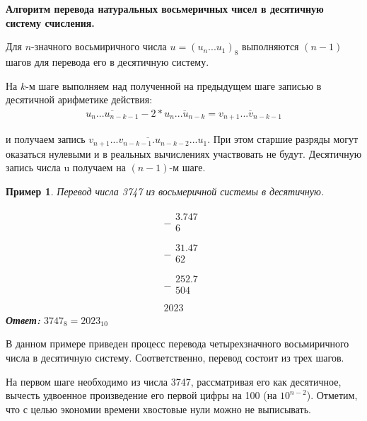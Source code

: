 \documentclass[14pt, russian]{scrartcl}
\newcounter{cExample}
\newtheorem{Example}{Пример}[cExample]
\begin{document}
\vspace{1em}
\textbf{Алгоритм перевода натуральных восьмеричных чисел в десятичную систему счисления.}

Для $n$-значного восьмиричного числа $u = (u_n...u_1)_8$ выполняются $(n - 1)$ шагов для перевода его в десятичную систему.

На $k$-м шаге выполняем над полученной на предыдущем шаге записью в десятичной арифметике действия:
\label{Example:MathFont4} 
\begin{equation*}\label{eq:4}
\begin{aligned}
\overline{u_n ... u_{n-k-1}} - 2 * \overline{u_n ... u_{n-k}} = \overline{v_{n+1} ... v_{n-k-1}}
\end{aligned}
\end{equation*} 

и получаем запись $\overline{v_{n+1} ... v_{n-k-1}.u_{n-k-2} ... u_1}$. При этом старшие разряды могут оказаться нулевыми и в реальных вычислениях участвовать не будут. Десятичную запись числа u получаем на $(n - 1)$-м шаге.

\begin{Example}\label{Example:MathFont5}
Перевод числа 3747 из восьмеричной системы в десятичную. 

$$
\begin{array}{r}
-
\begin{array}{r}
3.747\\
6\quad\quad\\
\end{array} \\
\hline
-
\begin{array}{r}
31.47\\
62\,\,\,\,\\
\end{array} \\
\hline
-
\begin{array}{r}
252.7\\
504\\
\end{array} \\
\hline
2023\,\,\,
\end{array}
$$
\textbf{Ответ:} $3747_8 = 2023_{10}$ 
\end{Example} 


В данном примере приведен процесс перевода четырехзначного восьмиричного числа в десятичную систему. Соответственно, перевод состоит из трех шагов.

На первом шаге необходимо из числа 3747, рассматривая его как десятичное, вычесть удвоенное произведение его первой цифры на 100 (на $10^{n-2}$). Отметим, что с целью экономии времени хвостовые нули можно не выписывать.
\end{document}
